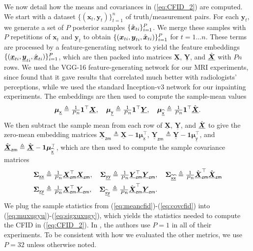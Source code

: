 \documentclass{article}
\theoremstyle{plain}
\theoremstyle{definition}
\theoremstyle{remark}
\renewcommand{\hat}{\widehat}
\newcommand{\defn}{\triangleq}
\newcommand{\uvec}[1]{\ensuremath{\underline{\boldsymbol{#1}}}}
\newcommand{\hvec}[1]{\ensuremath{\Hat{\boldsymbol{#1}}}}
\renewcommand{\vec}[1]{\ensuremath{\boldsymbol{#1}}}
\newcommand{\huvec}[1]{\ensuremath{\Hat{\underline{\boldsymbol{#1}}}}}
\newcommand{\tran}{^{\top}}
\renewcommand{\eqref}[1]{(\ref{eq:#1})}
\newcommand{\muxu}{\vec{\mu}_{\underline{\mathsf{x}}}}
\newcommand{\muxhu}{\vec{\mu}_{\underline{\hat{\mathsf{x}}}}}
\newcommand{\muyu}{\vec{\mu}_{\underline{\mathsf{y}}}}
\newcommand{\Sigxuxu}{\vec{\Sigma}_{\underline{\mathsf{x}}\underline{\mathsf{x}}}}
\newcommand{\Sigxhuxhu}{\vec{\Sigma}_{\underline{\hat{\mathsf{x}}}\underline{\hat{\mathsf{x}}}}}
\newcommand{\Sigyuyu}{\vec{\Sigma}_{\underline{\mathsf{y}}\underline{\mathsf{y}}}}
\newcommand{\Sigxuyu}{\vec{\Sigma}_{\underline{\mathsf{x}}\underline{\mathsf{y}}}}
\newcommand{\Sigxhuyu}{\vec{\Sigma}_{\underline{\hat{\mathsf{x}}}\underline{\mathsf{y}}}}
\newcommand{\zm}{_{\mathsf{zm}}}
\begin{document}
We now detail how the means and covariances in \eqref{CFID_2} are computed.
We start with a dataset $\{(\vec{x}_t, \vec{y}_t)\}_{t=1}^n$ of truth/measurement pairs.
For each $\vec{y}_t$, we generate a set of $P$ posterior samples $\{\hvec{x}_{ti}\}_{i=1}^{P}$. 
We merge these samples with $P$ repetitions of $\vec{x}_t$ and $\vec{y}_t$ to obtain $\{(\vec{x}_{ti}, \vec{y}_{ti}, \hvec{x}_{ti})\}_{i=1}^{P}$ for $t=1\dots n$.
These terms are processed by a feature-generating network to yield the feature embeddings $\{(\uvec{x}_{ti}, \uvec{y}_{ti}, \huvec{x}_{ti})\}_{i=1}^{P}$, which are then packed into matrices $\uvec{X}$, $\uvec{Y}$, and $\huvec{X}$ with $P n$ rows.
We used the VGG-16 feature-generating network \cite{Simonyan:14} for our MRI experiments, since \cite{Kastryulin:22} found that it gave results that correlated much better with radiologists' perceptions, while we used the standard Inception-v3 network \cite{Szegedy:CVPR:16} for our inpainting experiments. 
The embeddings are then used to compute the sample-mean values
\begin{align} \textstyle
\muxu \defn \frac{1}{P n} \vec{1}\tran \uvec{X},
\quad
\muyu \defn \frac{1}{P n} \vec{1}\tran \uvec{Y},
\quad
\muxhu \defn \frac{1}{P n} \vec{1}\tran \huvec{X}
\label{eq:meancfid}.
\end{align}
We then subtract the sample mean from each row of $\uvec{X}$, $\uvec{Y}$, and $\huvec{X}$ to give the zero-mean embedding matrices $\uvec{X}\zm\defn\uvec{X}-\vec{1}\muxu\tran$, $\uvec{Y}\zm\defn\uvec{Y}-\vec{1}\muyu\tran$, and $\huvec{X}\zm\defn\huvec{X}-\vec{1}\muxhu\tran$, which are then used to compute the sample covariance matrices
\begin{subequations} \label{eq:covcfid}
\begin{align}
\Sigxuxu 
&\defn \textstyle \frac{1}{P n} \uvec{X}\zm\tran\uvec{X}\zm, \quad
\Sigyuyu
\defn \frac{1}{P n} \uvec{Y}\zm\tran\uvec{Y}\zm, \quad
\Sigxhuxhu
\defn \frac{1}{P n} \huvec{X}\zm\tran\huvec{X}\zm \\
\Sigxuyu
&\defn \textstyle \frac{1}{P n} \uvec{X}\zm\tran\uvec{Y}\zm , \quad
\Sigxhuyu
\defn \frac{1}{P n} \huvec{X}\zm\tran\uvec{Y}\zm .
\end{align}
\end{subequations}
We plug the sample statistics from \eqref{meancfid}-\eqref{covcfid} into \eqref{muxugyu}-\eqref{sigxuxugy}, which yields the statistics needed to compute the CFID in \eqref{CFID_2}. 
In \cite{Soloveitchik:21}, the authors use $P=1$ in all of their experiments. 
To be consistent with how we evaluated the other metrics, we use $P=32$ unless otherwise noted.
\end{document}
